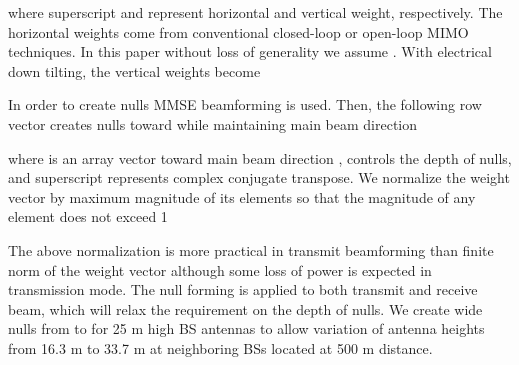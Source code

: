\documentclass[twocolumn]{IEEEtran}
\begin{document}
where superscript  and  represent horizontal
and vertical weight, respectively. The horizontal weights  come from conventional closed-loop or open-loop MIMO techniques.
In this paper without loss of generality we assume . With
 electrical down tilting, the vertical weights become



In order to create nulls MMSE beamforming is used. Then, the
following row vector creates nulls toward 
while maintaining main beam direction 


where  is an array vector toward
main beam direction ,  controls the depth of
nulls, and superscript  represents complex conjugate
transpose. We normalize the weight vector by maximum magnitude of
its elements so that the magnitude of any element does not exceed 1


The above normalization is more practical in transmit beamforming
than finite norm of the weight vector although some loss of power is
expected in transmission mode. The null forming is applied to both
transmit and receive beam, which will relax the requirement on the
depth of nulls. We create wide nulls from  to 
for 25 m high BS antennas to allow variation of antenna heights from
16.3 m to 33.7 m at neighboring BSs located at 500 m distance.
\end{document}
